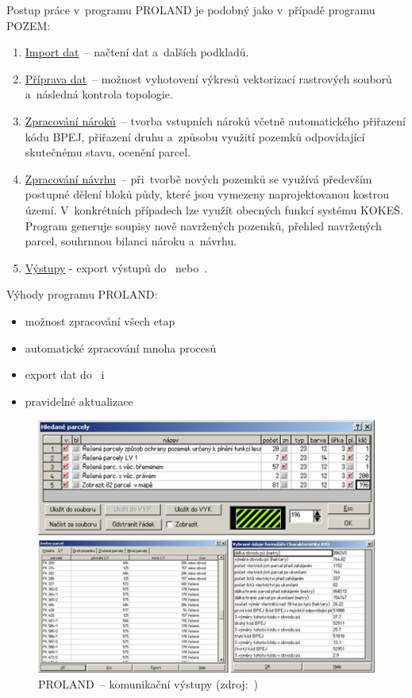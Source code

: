 Postup práce v~programu PROLAND je podobný jako v~případě programu
POZEM: \vspace{-\topsep}
	\begin{enumerate}[leftmargin=1.5cm, noitemsep]
		\item \underline{Import dat}~– načtení dat 
a~dalších podkladů.
		\item \underline{Příprava dat}~– možnost vyhotovení
výkresů vektorizací rastrových souborů a~následná kontrola topologie.
		\item \underline{Zpracování nároků}~– tvorba vstupních
nároků včetně automatického přiřaze\-ní kódu BPEJ, přiřazení druhu
a~způsobu využití pozemků odpovídající skutečnému stavu, ocenění
parcel.
		\item \underline{Zpracování návrhu}~– při~tvorbě
nových pozemků se využívá především postupné dělení bloků půdy, které
jsou vymezeny naprojektovanou kostrou území. V~konkrétních případech
lze využít obecných funkcí systému KOKEŠ. Program generuje soupisy
nově navržených pozemků, přehled navržených parcel, souhrnnou bilanci
nároku a~návrhu.
		\item \underline{Výstupy} - export výstupů do~
nebo~.
	\end{enumerate}

Výhody programu PROLAND: \vspace{-\topsep}
	\begin{itemize}[leftmargin=1.5cm, noitemsep]
		\item možnost zpracování všech etap 
		\item automatické zpracování mnoha procesů 
		\item export dat do~ i~
		\item pravidelné aktualizace
	\end{itemize}

	\begin{figure}[H] \centering
		\includegraphics[width=.8\textwidth]{./pictures/proland.png}
		\caption[PROLAND~– komunikační výstupy]{PROLAND~–
komunikační výstupy (zdroj:~\citep{proland_obrazek})}
		\label{fig:proland_obrazek}
 	\end{figure}

